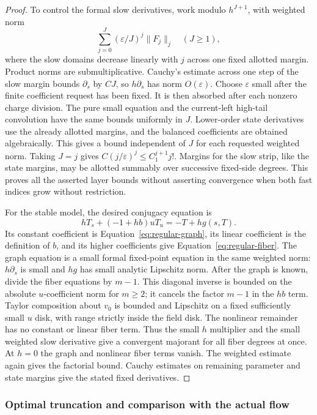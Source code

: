 \begin{proof}
To control the formal slow derivatives, work modulo $h^{J+1}$, with
weighted norm
\[
 \sum_{j=0}^J (\varepsilon/J)^j\|F_j\|_j \quad (J\ge1),
\]
where the slow domains decrease linearly with $j$ across one fixed
allotted margin.  Product norms are submultiplicative.  Cauchy's
estimate across one step of the slow margin bounds $\partial_s$ by
$C J$, so $h\partial_s$ has norm $O(\varepsilon)$.  Choose
$\varepsilon$ small after the finite coefficient request has been
fixed.  It is then absorbed after each nonzero charge division.  The
pure small equation and the current-left high-tail convolution have
the same bounds uniformly in $J$.  Lower-order state derivatives use
the already allotted margins, and the balanced coefficients are
obtained algebraically.  This gives a bound independent of $J$ for
each requested weighted norm.  Taking $J=j$ gives
$C(j/\varepsilon)^j\le C_1^{j+1}j!$.  Margins for the slow strip,
like the state margins, may be allotted summably over successive
fixed-side degrees.  This proves all the asserted layer bounds
without asserting convergence when both fast indices grow without
restriction.

For the stable model, the desired conjugacy equation is
\begin{equation}\label{eq:regular-stable-conjugacy}
 hT_s+(-1+hb)uT_u=-T+hg(s,T).
\end{equation}
Its constant coefficient is Equation~\eqref{eq:regular-graph}, its linear
coefficient is the definition of $b$, and its higher coefficients
give Equation~\eqref{eq:regular-fiber}.  The graph equation is a small formal
fixed-point equation in the same weighted norm: $h\partial_s$ is
small and $h g$ has small analytic Lipschitz norm.  After the graph is
known, divide the fiber equations by $m-1$.  This diagonal inverse is
bounded on the absolute $u$-coefficient norm for $m\ge2$; it cancels
the factor $m-1$ in the $hb$ term.  Taylor composition about $v_0$ is
bounded and Lipschitz on a fixed sufficiently small $u$ disk, with
range strictly inside the field disk.  The nonlinear remainder has
no constant or linear fiber term.  Thus the small $h$ multiplier and
the small weighted slow derivative give a convergent majorant for
all fiber degrees at once.  At $h=0$ the graph and nonlinear fiber
terms vanish.  The weighted estimate again gives the factorial
bound.  Cauchy estimates on remaining parameter and state margins
give the stated fixed derivatives.
\end{proof}

\subsubsection{Optimal truncation and comparison with the actual flow}

